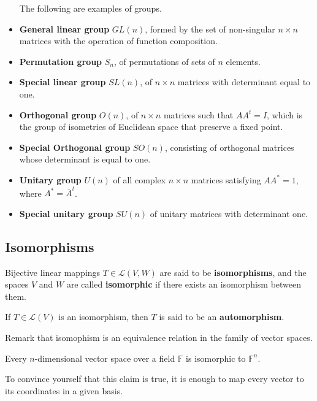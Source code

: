 \begin{example}
	\begin{itemize} The following are examples of groups.
		\item \textbf{General linear group} $GL(n)$, formed by the set of non-singular $n \times n$ matrices with the operation of function composition.
		\item \textbf{Permutation group} $S_n$, of permutations of sets of $n$ elements.
		\item \textbf{Special linear group} $SL(n)$, of $n \times n$ matrices with determinant equal to one.
		\item \textbf{Orthogonal group} $O(n)$, of $n \times n$ matrices such that $A A^t = I$, which is the group of isometries of Euclidean space that preserve a fixed point.
		\item \textbf{Special Orthogonal group} $SO(n)$, consisting of orthogonal matrices whose determinant is equal to one.
		\item \textbf{Unitary group} $U(n)$ of all complex $n \times n$ matrices satisfying $A A^\ast = 1$, where $A^\ast = \bar{A}^t$.
		\item \textbf{Special unitary group} $SU(n)$ of unitary matrices with determinant one.
	\end{itemize}
\end{example}

\subsection*{Isomorphisms}

\begin{definition}[Isomorsphism]
	Bijective linear mappings $T \in \mathcal{L}(V,W)$ are said to be \textbf{isomorphisms}, and the spaces $V$ and $W$ are called \textbf{isomorphic} if there exists an isomorphism between them.

	If $T \in \mathcal{L}(V)$ is an isomorphism, then $T$ is said to be an \textbf{automorphism}.
\end{definition}

Remark that isomophism is an equivalence relation in the family of vector spaces.

\begin{theorem}
	Every $n$-dimensional vector space over a field $\mathbb{F}$ is isomorphic to $\mathbb{F}^n$.
\end{theorem}

To convince yourself that this claim is true, it is enough to map every vector to its coordinates in a given basis.

